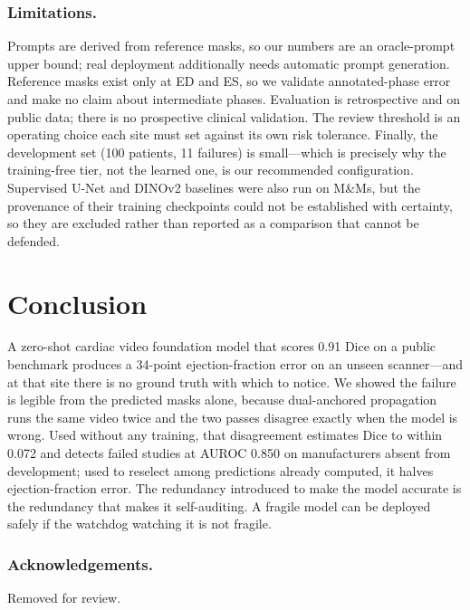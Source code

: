 \documentclass[runningheads]{llncs}
\begin{document}
\subsubsection{Limitations.}
Prompts are derived from reference masks, so our numbers are an oracle-prompt upper bound;
real deployment additionally needs automatic prompt generation. Reference masks exist only
at ED and ES, so we validate annotated-phase error and make no claim about intermediate
phases. Evaluation is retrospective and on public data; there is no prospective clinical
validation. The review threshold is an operating choice each site must set against its own
risk tolerance. Finally, the development set (100 patients, 11 failures) is small---which is
precisely why the training-free tier, not the learned one, is our recommended configuration.
Supervised U-Net and DINOv2 baselines were also run on M\&Ms, but the provenance of their
training checkpoints could not be established with certainty, so they are excluded rather than
reported as a comparison that cannot be defended.


\section{Conclusion}

A zero-shot cardiac video foundation model that scores 0.91 Dice on a public benchmark
produces a 34-point ejection-fraction error on an unseen scanner---and at that site there is
no ground truth with which to notice. We showed the failure is legible from the predicted
masks alone, because dual-anchored propagation runs the same video twice and the two passes
disagree exactly when the model is wrong. Used without any training, that disagreement
estimates Dice to within 0.072 and detects failed studies at AUROC 0.850 on manufacturers
absent from development; used to reselect among predictions already computed, it halves
ejection-fraction error. The redundancy introduced to make the model accurate is the
redundancy that makes it self-auditing. A fragile model can be deployed safely if the
watchdog watching it is not fragile.


\subsubsection{Acknowledgements.} Removed for review.



\end{document}
